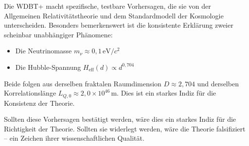 Die WDBT+ macht spezifische, testbare Vorhersagen, die sie von der Allgemeinen Relativitätstheorie und dem Standardmodell der Kosmologie unterscheiden. Besonders bemerkenswert ist die konsistente Erklärung zweier scheinbar unabhängiger Phänomene:

\begin{itemize}
    \item Die Neutrinomasse \( m_\nu \approx 0,1 \, \text{eV}/c^2 \)
    \item Die Hubble-Spannung \( H_{\text{eff}}(d) \propto d^{0,704} \)
\end{itemize}

Beide folgen aus derselben fraktalen Raumdimension \( D \approx 2,704 \) und derselben Korrelationslänge \( L_{Q,0} \approx 2{,}0 \times 10^{46} \, \text{m} \). Dies ist ein starkes Indiz für die Konsistenz der Theorie.

Sollten diese Vorhersagen bestätigt werden, wäre dies ein starkes Indiz für die Richtigkeit der Theorie. Sollten sie widerlegt werden, wäre die Theorie falsifiziert – ein Zeichen ihrer wissenschaftlichen Qualität.